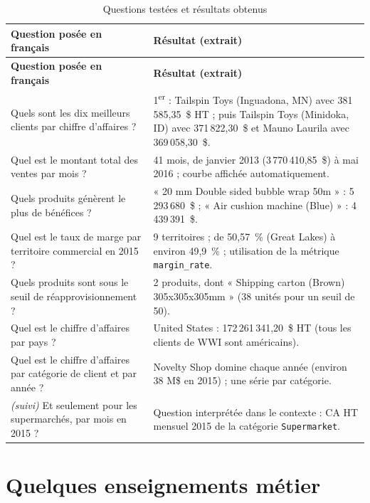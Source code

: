 \begin{longtable}{@{}p{6.2cm}p{8.3cm}@{}}
\caption{Questions testées et résultats obtenus}
\label{tab:eval}\\
\toprule
\textbf{Question posée en français} & \textbf{Résultat (extrait)} \\
\midrule
\endfirsthead
\toprule
\textbf{Question posée en français} & \textbf{Résultat (extrait)} \\
\midrule
\endhead
Quels sont les dix meilleurs clients par chiffre d'affaires ? &
  1\textsuperscript{er} : Tailspin Toys (Inguadona, MN) avec 381\,585,35~\$ HT ; puis Tailspin Toys
  (Minidoka, ID) avec 371\,822,30~\$ et Mauno Laurila avec 369\,058,30~\$. \\
\addlinespace
Quel est le montant total des ventes par mois ? &
  41 mois, de janvier 2013 (3\,770\,410,85~\$) à mai 2016 ; courbe affichée automatiquement. \\
\addlinespace
Quels produits génèrent le plus de bénéfices ? &
  « 20 mm Double sided bubble wrap 50m » : 5\,293\,680~\$ ; « Air cushion machine (Blue) » :
  4\,439\,391~\$. \\
\addlinespace
Quel est le taux de marge par territoire commercial en 2015 ? &
  9 territoires ; de 50,57~\% (Great Lakes) à environ 49,9~\% ; utilisation de la métrique
  \texttt{margin\_rate}. \\
\addlinespace
Quels produits sont sous le seuil de réapprovisionnement ? &
  2 produits, dont « Shipping carton (Brown) 305x305x305mm » (38 unités pour un seuil de 50). \\
\addlinespace
Quel est le chiffre d'affaires par pays ? &
  United States : 172\,261\,341,20~\$ HT (tous les clients de WWI sont américains). \\
\addlinespace
Quel est le chiffre d'affaires par catégorie de client et par année ? &
  Novelty Shop domine chaque année (environ 38 M\$ en 2015) ; une série par catégorie. \\
\addlinespace
\emph{(suivi)} Et seulement pour les supermarchés, par mois en 2015 ? &
  Question interprétée dans le contexte : CA HT mensuel 2015 de la catégorie \texttt{Supermarket}. \\
\bottomrule
\end{longtable}

\section{Quelques enseignements métier}

